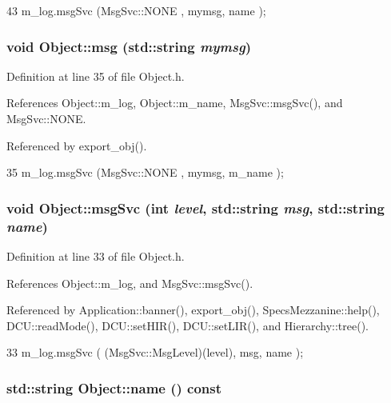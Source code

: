 \begin{DoxyCode}
43 { m_log.msgSvc (MsgSvc::NONE    , mymsg, name ); }
\end{DoxyCode}
\hypertarget{classObject_a58b2d0618c2d08cf2383012611528d97}{
\subsubsection[{msg}]{\setlength{\rightskip}{0pt plus 5cm}void Object::msg (std::string {\em mymsg})}}
\label{classObject_a58b2d0618c2d08cf2383012611528d97}


Definition at line 35 of file Object.h.

References Object::m\_\-log, Object::m\_\-name, MsgSvc::msgSvc(), and MsgSvc::NONE.

Referenced by export\_\-obj().


\begin{DoxyCode}
35 { m_log.msgSvc (MsgSvc::NONE    , mymsg, m_name ); }
\end{DoxyCode}
\hypertarget{classObject_a3f9d5537ebce0c0f2bf6ae4d92426f3c}{
\subsubsection[{msgSvc}]{\setlength{\rightskip}{0pt plus 5cm}void Object::msgSvc (int {\em level}, \/  std::string {\em msg}, \/  std::string {\em name})}}
\label{classObject_a3f9d5537ebce0c0f2bf6ae4d92426f3c}


Definition at line 33 of file Object.h.

References Object::m\_\-log, and MsgSvc::msgSvc().

Referenced by Application::banner(), export\_\-obj(), SpecsMezzanine::help(), DCU::readMode(), DCU::setHIR(), DCU::setLIR(), and Hierarchy::tree().


\begin{DoxyCode}
33 { m_log.msgSvc ( (MsgSvc::MsgLevel)(level), msg, name ); }
\end{DoxyCode}
\hypertarget{classObject_a975e888d50bfcbffda2c86368332a5cd}{
\subsubsection[{name}]{\setlength{\rightskip}{0pt plus 5cm}std::string Object::name () const}}
\label{classObject_a975e888d50bfcbffda2c86368332a5cd}


